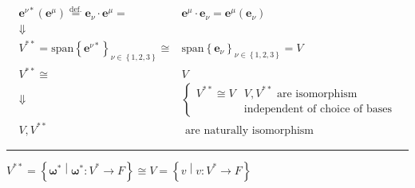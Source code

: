 \documentclass[
]{book}
\theoremstyle{definition}
\theoremstyle{definition}
\theoremstyle{definition}
\theoremstyle{definition}
\theoremstyle{remark}
\begin{document}
\[
\begin{aligned}
\boldsymbol{e}^{{\scriptscriptstyle \nu}*}\left(\boldsymbol{e}^{{\scriptscriptstyle \mu}}\right)\overset{\text{def.}}{=}\boldsymbol{e}_{{\scriptscriptstyle \nu}}\cdot\boldsymbol{e}^{{\scriptscriptstyle \mu}}= & \boldsymbol{e}^{{\scriptscriptstyle \mu}}\cdot\boldsymbol{e}_{{\scriptscriptstyle \nu}}=\boldsymbol{e}^{{\scriptscriptstyle \mu}}\left(\boldsymbol{e}_{{\scriptscriptstyle \nu}}\right)\\
\Downarrow\\
V^{**}=\mathrm{span}\left\{ \boldsymbol{e}^{{\scriptscriptstyle \nu}*}\right\} _{{\scriptscriptstyle \nu\in\left\{ 1,2,3\right\} }}\cong & \mathrm{span}\left\{ \boldsymbol{e}_{{\scriptscriptstyle \nu}}\right\} _{{\scriptscriptstyle \nu\in\left\{ 1,2,3\right\} }}=V\\
V^{**}\cong & V\\
\Downarrow & \begin{cases}
V^{**}\cong V & V,V^{**}\text{ are isomorphism}\\
 & \text{independent of choice of bases}
\end{cases}\\
V,V^{**} & \text{ are naturally isomorphism}
\end{aligned}
\]

\begin{center}\rule{0.5\linewidth}{0.5pt}\end{center}

\(V^{**}=\left\{ \boldsymbol{\omega}^{*}\middle|\boldsymbol{\omega}^{*}:V^{*}\rightarrow F\right\} \cong V=\left\{ v\middle|v:V^{*}\rightarrow F\right\}\)
\end{document}
